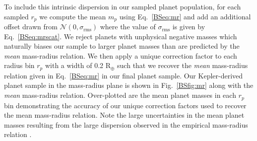 \noindent To include this intrinsic dispersion in our sampled planet population, for each sampled $r_p$
we compute the mean $m_p$ using Eq.~\ref{BSeq:mr} and add an additional offset drawn from
$\mathcal{N}(0,\sigma_{\text{rms}})$
where the value of $\sigma_{\text{rms}}$ is given by Eq.~\ref{BSeq:mrscat}. We reject planets with unphysical
negative masses
which naturally biases our sample to larger planet masses than are predicted by the \emph{mean} mass-radius
relation. We then apply a unique correction factor to each radius bin $r_p$ with a width of 0.2 R$_{\oplus}$
such that we recover the \emph{mean} mass-radius relation given in Eq.~\ref{BSeq:mr} in our final planet sample.
Our Kepler-derived planet sample in the mass-radius plane is shown in Fig.~\ref{BSfig:mr} along with the 
\emph{mean} mass-radius relation. Over-plotted are the mean planet masses in each $r_p$ bin demonstrating the
accuracy of our unique correction factors used to recover the mean mass-radius relation. Note the large
uncertainties in the mean planet masses resulting from the large dispersion observed in the empirical mass-radius
relation \citep{weiss14}. \\

